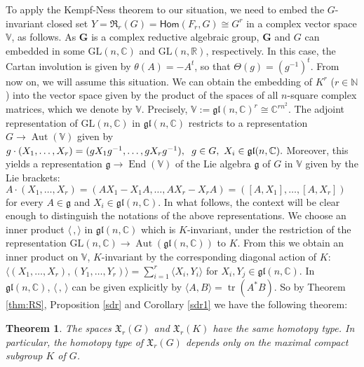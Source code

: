 \documentclass[a4paper,11pt,twoside]{article}
\newcounter{a}
\numberwithin{equation}{section}
\numberwithin{figure}{section}
\theoremstyle{plain}
\newtheorem{thm}{Theorem}[section]
\theoremstyle{definition}
\theoremstyle{remark}
\theoremstyle{plain}
\theoremstyle{plain}
\theoremstyle{plain}
\begin{document}
To apply the Kempf-Ness theorem to our situation, we need to embed
the $G$-invariant closed set $Y=\mathfrak{R}_{r}(G)={\mathsf{Hom}}(F_{r},G)\cong G^r$
in a complex vector space $\mathbb{V}$, as follows.
As $\mathbf{G}$ is a complex reductive algebraic group, $\mathbf{G}$ and $G$ can embedded in some $ \mathrm{GL}(n,\mathbb{C})$ and $ \mathrm{GL}(n,\mathbb{R})$, respectively. In this case, the Cartan involution is given by $\theta(A)=-A^{t}$, so that $\Theta(g)=(g^{-1})^{t}$. From now on, we will assume this situation.
We can obtain the embedding of $K^{r}$ ($r\in\mathbb{N}$)
into the vector space given by the product of the spaces of all $n$-square
complex matrices, which we denote by ${\mathbb{V}}$.  Precisely, ${\mathbb{V}}:=\mathfrak{gl}(n,{\mathbb{C}})^{r}\cong{\mathbb{C}}^{rn^{2}}$.
The adjoint representation of ${\mathrm{GL}}(n,{\mathbb{C}})$ in $\mathfrak{gl}(n,{\mathbb{C}})$
restricts to a representation $
G\to\operatorname{Aut}({\mathbb{V}})$
given by $
g\cdot(X_{1},\ldots,X_{r})=(gX_{1}g^{-1},\ldots,gX_{r}g^{-1}),\hspace{0.2cm}g\in G,\ X_{i}\in\mathfrak{gl}(n,{\mathbb{C}}).$
Moreover, this yields a representation $
{\mathfrak{g}}\to\operatorname{End}({\mathbb{V}})$
of the Lie algebra ${\mathfrak{g}}$ of $G$ in ${\mathbb{V}}$ given by the Lie brackets:
$
A\cdot(X_{1},\ldots,X_{r})=(AX_{1}-X_{1}A,\ldots,AX_{r}-X_{r}A)=([A,X_{1}],\ldots,[A,X_{r}])$
for every $A\in{\mathfrak{g}}$ and $X_{i}\in\mathfrak{gl}(n,{\mathbb{C}})$. In what
follows, the context will be clear enough to distinguish the notations
of the above representations.
We choose an inner product ${\langle}\,,{\rangle}$ in $\mathfrak{gl}(n,{\mathbb{C}})$
which is $K$-invariant, under the restriction of the representation
${\mathrm{GL}}(n,{\mathbb{C}})\to\operatorname{Aut}(\mathfrak{gl}(n,{\mathbb{C}}))$ to $K$. From this we obtain
an inner product on ${\mathbb{V}}$, $K$-invariant by the corresponding diagonal
action of $K$: $
{\langle}(X_{1},\ldots,X_{r}),(Y_{1},\ldots,Y_{r}){\rangle}=\sum_{i=1}^{r}{\langle} X_{i},Y_{i}{\rangle}$
for $X_{i},Y_{j}\in\mathfrak{gl}(n,{\mathbb{C}})$. In $\mathfrak{gl}(n,{\mathbb{C}})$,
${\langle}\,,\,{\rangle}$ can be given explicitly by ${\langle} A,B{\rangle}=\operatorname{tr}(A^{*}B)$.
So by Theorem \ref{thm:RS}, Proposition \ref{sdr} and Corollary \ref{sdr1} we have the following theorem:
\begin{thm}
\label{main} The spaces $\mathfrak{X}_{r}(G)$ and $\mathfrak{X}_{r}(K)$
have the same homotopy type. In particular, the homotopy type of $\mathfrak{X}_{r}(G)$ depends only
on the maximal compact subgroup $K$ of $G$.\end{thm}
\end{document}

